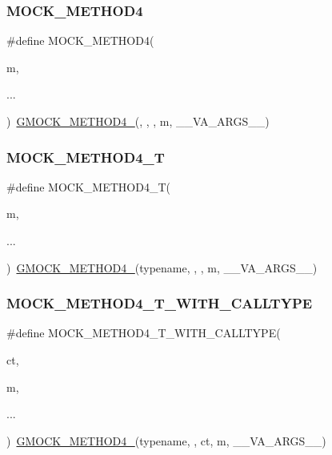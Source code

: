 \subsubsection{\texorpdfstring{MOCK\_METHOD4}{MOCK\_METHOD4}}
{\footnotesize\ttfamily \#define M\+O\+C\+K\+\_\+\+M\+E\+T\+H\+O\+D4(\begin{DoxyParamCaption}\item[{}]{m,  }\item[{}]{... }\end{DoxyParamCaption})~\mbox{\hyperlink{gmock-generated-function-mockers_8h_ab6430f2cfad9de4aca5258ea559294bb}{G\+M\+O\+C\+K\+\_\+\+M\+E\+T\+H\+O\+D4\+\_\+}}(, , , m, \+\_\+\+\_\+\+V\+A\+\_\+\+A\+R\+G\+S\+\_\+\+\_\+)}

\mbox{\label{gmock-generated-function-mockers_8h_a17dde4ac8109f0bf1b73e3509e42c879}} 
\subsubsection{\texorpdfstring{MOCK\_METHOD4\_T}{MOCK\_METHOD4\_T}}
{\footnotesize\ttfamily \#define M\+O\+C\+K\+\_\+\+M\+E\+T\+H\+O\+D4\+\_\+T(\begin{DoxyParamCaption}\item[{}]{m,  }\item[{}]{... }\end{DoxyParamCaption})~\mbox{\hyperlink{gmock-generated-function-mockers_8h_ab6430f2cfad9de4aca5258ea559294bb}{G\+M\+O\+C\+K\+\_\+\+M\+E\+T\+H\+O\+D4\+\_\+}}(typename, , , m, \+\_\+\+\_\+\+V\+A\+\_\+\+A\+R\+G\+S\+\_\+\+\_\+)}

\mbox{\label{gmock-generated-function-mockers_8h_aae18ec395b1ba3e991a25ffb997821ee}} 
\subsubsection{\texorpdfstring{MOCK\_METHOD4\_T\_WITH\_CALLTYPE}{MOCK\_METHOD4\_T\_WITH\_CALLTYPE}}
{\footnotesize\ttfamily \#define M\+O\+C\+K\+\_\+\+M\+E\+T\+H\+O\+D4\+\_\+\+T\+\_\+\+W\+I\+T\+H\+\_\+\+C\+A\+L\+L\+T\+Y\+PE(\begin{DoxyParamCaption}\item[{}]{ct,  }\item[{}]{m,  }\item[{}]{... }\end{DoxyParamCaption})~\mbox{\hyperlink{gmock-generated-function-mockers_8h_ab6430f2cfad9de4aca5258ea559294bb}{G\+M\+O\+C\+K\+\_\+\+M\+E\+T\+H\+O\+D4\+\_\+}}(typename, , ct, m, \+\_\+\+\_\+\+V\+A\+\_\+\+A\+R\+G\+S\+\_\+\+\_\+)}

